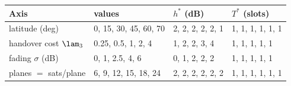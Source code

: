 \footnotesize
\begin{tabular}{@{}llll@{}}
\toprule
Axis & values & $h^\ast$ (dB) & $T^\ast$ (slots) \\
\midrule
latitude (deg) & 0, 15, 30, 45, 60, 70 & 2, 2, 2, 2, 2, 1 & 1, 1, 1, 1, 1, 1 \\
handover cost $\lam_3$ & 0.25, 0.5, 1, 2, 4 & 1, 2, 2, 3, 4 & 1, 1, 1, 1, 1 \\
fading $\sigma$ (dB) & 0, 1, 2.5, 4, 6 & 0, 1, 2, 2, 2 & 1, 1, 1, 1, 1 \\
planes $=$ sats/plane & 6, 9, 12, 15, 18, 24 & 2, 2, 2, 2, 2, 2 & 1, 1, 1, 1, 1, 1 \\
\bottomrule
\end{tabular}
